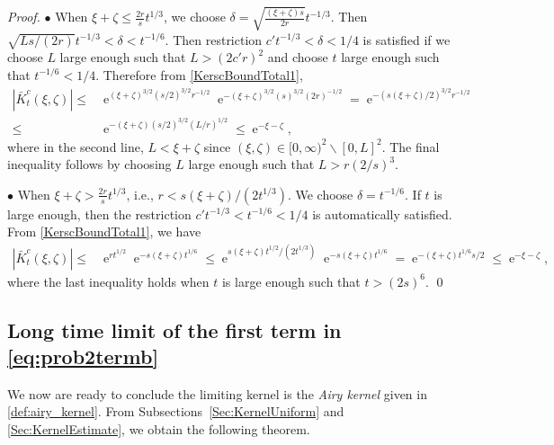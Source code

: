 \documentclass[cmp]{svjour}
\numberwithin{theorem}{section}
\numberwithin{equation}{section}
\DeclareMathOperator{\e}{e}
\def\i{{\infty}}
\begin{document}
\begin{proof}
$\bullet$ When $\xi + \zeta \leq \frac{2r}{s} t^{1/3}$,  we choose $\delta = \sqrt{\frac{(\xi +\zeta ) s}{2 r}} t^{-1/3}$. Then $ \sqrt{L s/(2r)} t^{-1/3} < \delta < t^{-1/6}$. Then restriction $c' t^{-1/3} < \delta <1/4 $ is satisfied if we choose $L$ large enough such that $L>(2c'r)^2$ and choose $t$ large enough such that $t^{-1/6} < 1/4$. Therefore from \eqref{KerscBoundTotal1}, 
\begin{align*}
	\left| \bar{K}_t^{c}(\xi , \zeta) \right| \leq & 
	\e ^{(\xi +\zeta)^{3/2}(s/2)^{3/2}r^{-1/2}}
	\e^{-(\xi +\zeta)^{3/2}(s)^{3/2}(2r)^{-1/2}}=
	\e^{-(s(\xi + \zeta)/2)^{3/2}r^{-1/2}}\\
	\leq & \e^{-(\xi+\zeta)(s/2)^{3/2}(L/r)^{1/2}}
	\leq \e^{-\xi - \zeta},
\end{align*}
where in the second line, $L < \xi+\zeta$ since $(\xi , \zeta) \in [0, \i )^2 \backslash [0 , L]^2$. The final inequality follows by choosing $L$ large enough such that $L>r(2/s)^3$. 

$\bullet$ When $\xi + \zeta > \frac{2r}{s} t^{1/3}$, i.e., $r<s(\xi +\zeta)/(2t^{1/3})$.  We choose $\delta = t^{-1/6}$. If $t$ is large enough, then the restriction $c' t^{-1/3} < t^{-1/6} < 1/4$ is automatically satisfied. From \eqref{KerscBoundTotal1}, we have
\begin{align*}
	\left| \bar{K}_t^{c}(\xi , \zeta) \right| \leq & 
	\e^{rt^{1/2}}\e^{-s(\xi +\zeta)t^{1/6}}
	\leq 
	\e^{s(\xi +\zeta)t^{1/2}/(2t^{1/3})}\e^{-s(\xi +\zeta)t^{1/6}}=\e^{-(\xi+\zeta)t^{1/6}s/2}\leq \e^{-\xi-\zeta},
\end{align*}
where the last inequality holds when $t$ is large enough such that $t>(2s)^6$. \qed
	
\end{proof}


\subsection{Long time limit of the first term in \eqref{eq:prob2termb}}


We now are ready to conclude the limiting kernel is the \textit{Airy kernel} \cite{TW1994} given in \eqref{def:airy_kernel}.
From Subsections~\ref{Sec:KernelUniform} and \ref{Sec:KernelEstimate}, we obtain the following theorem.
\end{document}
